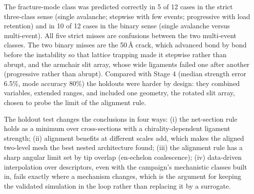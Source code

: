 The fracture-mode class was predicted correctly in 5 of 12 cases in the strict three-class sense (single avalanche; stepwise with few events; progressive with load retention) and in 10 of 12 cases in the binary sense (single avalanche versus multi-event). All five strict misses are confusions between the two multi-event classes. The two binary misses are the 50\,\AA{} crack, which advanced bond by bond before the instability so that lattice trapping made it stepwise rather than abrupt, and the armchair slit array, whose wide ligaments failed one after another (progressive rather than abrupt). Compared with Stage 4 (median strength error 6.5\%, mode accuracy 80\%) the holdouts were harder by design: they combined variables, extended ranges, and included one geometry, the rotated slit array, chosen to probe the limit of the alignment rule.

The holdout test changes the conclusions in four ways: (i) the net-section rule holds as a minimum over cross-sections with a chirality-dependent ligament strength; (ii) alignment benefits at different scales add, which makes the aligned two-level mesh the best nested architecture found; (iii) the alignment rule has a sharp angular limit set by tip overlap (en-echelon coalescence); (iv) data-driven interpolation over descriptors, even with the campaign's mechanistic classes built in, fails exactly where a mechanism changes, which is the argument for keeping the validated simulation in the loop rather than replacing it by a surrogate.
